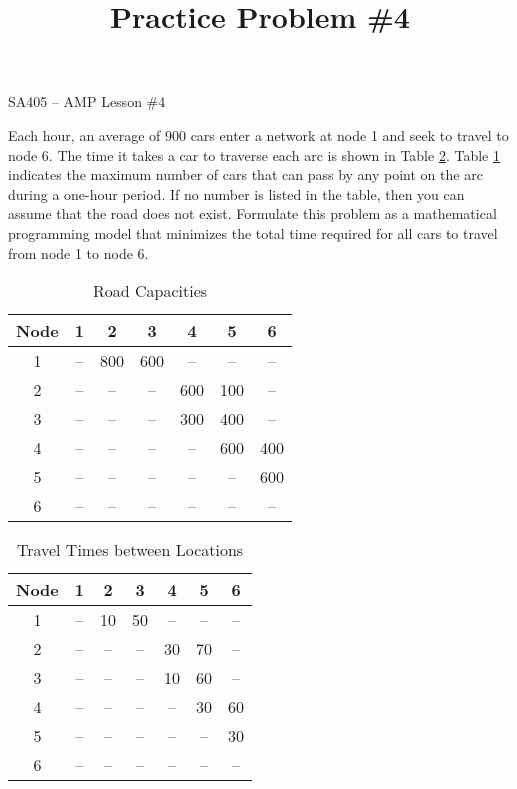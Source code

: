 \documentclass[11pt]{article}
\makeatletter
\theoremstyle{definition}
\renewcommand{\maketitle}{
  \noindent SA405 -- AMP \hfill Lesson \#4\\

  \begin{center}\Large{\textbf{\@title}}\end{center}
}
\makeatother
\begin{document}
  
\title{Practice Problem \#4}

\maketitle


Each hour, an average of 900 cars enter a network at node 1 and seek to travel to node 6. The time it takes a car to traverse each arc is shown in Table \ref{tab:template2}. Table \ref{tab:template1} indicates the maximum number of cars that can pass by any point on the arc during a one-hour period. If no number is listed in the table, then you can assume that the road does not exist. Formulate this problem as a mathematical programming model that minimizes the total time required for all cars to travel from node 1 to node 6.

\begin{table}[h]
\centering
\begin{tabular}{|c|c|c|c|c|c|c|}
\hline
Node & 1 & 2 & 3 & 4 & 5 & 6\\ \hline
1 & -- & 800 & 600 & -- & -- & --\\ \hline
2 & -- & -- & -- & 600 & 100 & --\\ \hline
3 & -- & -- & -- & 300 & 400 & --\\ \hline
4 & -- & -- & -- & -- & 600 & 400\\ \hline
5 & -- & -- & -- & -- & -- & 600\\ \hline
6 & -- & -- & -- & -- & -- & --\\ \hline
\end{tabular}
\caption{Road Capacities}
\label{tab:template1}
\end{table}

\begin{table}[h]
\centering
\begin{tabular}{|c|c|c|c|c|c|c|}
\hline
Node & 1 & 2 & 3 & 4 & 5 & 6\\ \hline
1 & -- & 10 & 50 & -- & -- & --\\ \hline
2 & -- & -- & -- & 30 & 70 & --\\ \hline
3 & -- & -- & -- & 10 & 60 & --\\ \hline
4 & -- & -- & -- & -- & 30 & 60\\ \hline
5 & -- & -- & -- & -- & -- & 30\\ \hline
6 & -- & -- & -- & -- & -- & --\\ \hline
\end{tabular}
\caption{Travel Times between Locations}
\label{tab:template2}
\end{table}
\newpage
\end{document}
